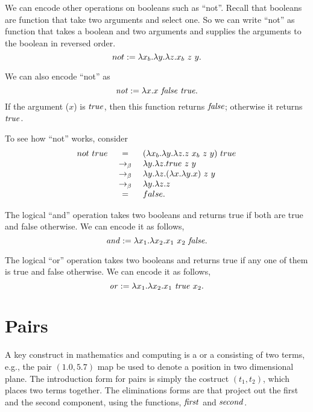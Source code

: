 \begin{gram}
We can encode other operations on booleans such as ``not''.
%
Recall that booleans are function that take
two arguments and select one.  So we can write ``not'' as function
that takes a boolean and two arguments and supplies the arguments to
the boolean in reversed order. 
\[
not := \lambda x_b. \lambda y. \lambda z. x_b~z~y.
\]

We can also encode ``not'' as 
\[
\mathit{not} := \lambda x. x~\mathit{false}~\mathit{true}.
\]
If the argument ($x$) is $\mathit{true}$, then this function returns
$\mathit{false}$; otherwise it returns $\mathit{true}$.
\end{gram}

\begin{example}
To see how ``not'' works, consider
\[
\begin{array}{rcl}
not~true & = & (\lambda x_b. \lambda y. \lambda z.z~x_b~z~y)~true\\
        & ~\rightarrow_{\beta}~ & \lambda y. \lambda z. true~z~y\\
        & ~\rightarrow_{\beta}~ & \lambda y. \lambda z. (\lambda x. \lambda y. x)~z~y\\
        & ~\rightarrow_{\beta}~ & \lambda y. \lambda z.z\\
        & = & false.
\end{array}
\]
\end{example}


\begin{gram}
The logical ``and'' operation takes two booleans and returns true if both are true and false otherwise.
%
We can encode it as follows,
\[
\mathit{and} := \lambda x_1. \lambda x_2. x_1~x_2~\mathit{false}.
\]
\end{gram}

\begin{gram}[Logical Or]
The logical ``or'' operation takes two booleans and returns true if any one of them is true and false otherwise.
%
We can encode it as follows,
\[
\mathit{or} := \lambda x_1.  \lambda x_2.  x_1~\mathit{true}~x_2.
\]
\end{gram}

\section{Pairs}
\label{sec:lcc:pairs}

A key construct in mathematics and computing is a  or a  consisting of two terms, e.g., the pair $(1.0, 5.7)$ map be used to denote a position in two dimensional plane.
%
The introduction form for pairs is simply the costruct $(t_1, t_2)$, which places two terms together.
%
The eliminations forms are  that project out the first and the second component, using the functions, $\mathit{first}$ and $\mathit{second}$.
 

